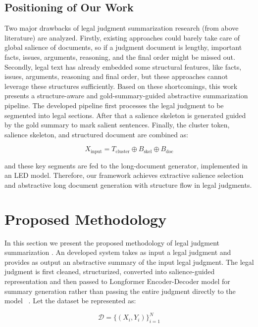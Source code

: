 \documentclass[11pt, a4paper]{article}
\theoremstyle{plain}%
\theoremstyle{remark}%
\theoremstyle{definition}%
\begin{document}
\subsection{Positioning of Our Work}

Two major drawbacks of legal judgment summarization research (from above literature) are analyzed. Firstly, existing approaches could barely take care of global salience of documents, so if a judgment document is lengthy, important facts, issues, arguments, reasoning, and the final order might be missed out. Secondly, legal text has already embedded some structural features, like facts, issues, arguments, reasoning and final order, but these approaches cannot leverage these structures sufficiently. Based on these shortcomings, this work presents a structure-aware and gold-summary-guided abstractive summarization pipeline. The developed pipeline first processes the legal judgment to be segmented into legal sections. After that a salience skeleton is generated guided by the gold summary to mark salient sentences.   Finally, the cluster token, salience skeleton, and structured document are combined as:

\begin{equation}
X_{\text{input}} = T_{\text{cluster}} \oplus B_{\text{skel}} \oplus B_{\text{doc}}
\end{equation}

and these key segments are fed to the long-document generator, implemented in an LED model. Therefore, our framework achieves extractive salience selection and abstractive long document generation with structure flow in legal judgments.

\section{Proposed Methodology}
\label{sec:methodology}

In this section we present the proposed methodology of legal judgment summarization . An developed system takes as input a legal judgment and provides as output an abstractive summary of the input legal judgment. The legal judgment is first cleaned, structurized, converted into salience-guided representation and then passed to Longformer Encoder-Decoder model for summary generation rather than passing the entire judgment directly to the model ~\cite{b21}.
Let the dataset be represented as:

\begin{equation}
\mathcal{D}=\{(X_i,Y_i)\}_{i=1}^{N}
\end{equation}
\end{document}
